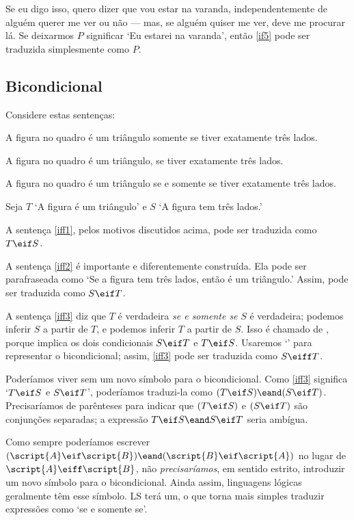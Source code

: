 Se eu digo isso, quero dizer que vou estar na varanda, independentemente de alguém querer me ver ou não — mas, se alguém quiser me ver, deve me procurar lá. Se deixarmos $P$ significar `Eu estarei na varanda', então \ref{if5} pode ser traduzida simplesmente como $P$.


\subsection{Bicondicional}
Considere estas sentenças:
\begin{earg}
\item[\ex{iff1}] A figura no quadro é um triângulo somente se tiver exatamente três lados.
\item[\ex{iff2}] A figura no quadro é um triângulo, se tiver exatamente três lados.
\item[\ex{iff3}] A figura no quadro é um triângulo se e somente se tiver exatamente três lados.
\end{earg}

Seja $T$ `A figura é um triângulo' e $S$ `A figura tem três lados.'

A sentença \ref{iff1}, pelos motivos discutidos acima, pode ser traduzida como $T\eif S$.

A sentença \ref{iff2} é importante e diferentemente construída. Ela pode ser parafraseada como `Se a figura tem três lados, então é um triângulo.' Assim, pode ser traduzida como $S\eif T$.

A sentença \ref{iff3} diz que $T$ é verdadeira \emph{se e somente se} $S$ é verdadeira; podemos inferir $S$ a partir de $T$, e podemos inferir $T$ a partir de $S$. Isso é chamado de , porque implica os dois condicionais $S\eif T$ e $T \eif S$. Usaremos `\eiff' para representar o bicondicional; assim, \ref{iff3} pode ser traduzida como $S \eiff T$.

Poderíamos viver sem um novo símbolo para o bicondicional. Como \ref{iff3} significa `$T \eif S$ e $S\eif T$', poderíamos traduzi-la como $(T \eif S)\eand(S\eif T)$. Precisaríamos de parênteses para indicar que $(T \eif S)$ e $(S\eif T)$ são conjunções separadas; a expressão $T \eif S\eand S\eif T$ seria ambígua.

Como sempre poderíamos escrever $(\script{A}\eif\script{B})\eand(\script{B}\eif\script{A})$ no lugar de $\script{A}\eiff\script{B}$, não \emph{precisaríamos}, em sentido estrito, introduzir um novo símbolo para o bicondicional. Ainda assim, linguagens lógicas geralmente têm esse símbolo. LS terá um, o que torna mais simples traduzir expressões como `se e somente se'.

